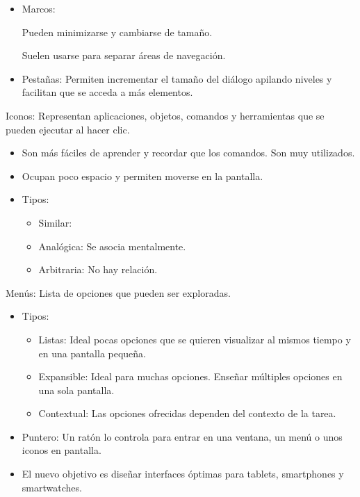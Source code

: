 \documentclass[12pt, twoside, openright]{report} %
\begin{document}
\begin{itemize}
\begin{itemize}
\begin{itemize}
			            \item Marcos:

			                  Pueden minimizarse y cambiarse de tamaño.

			                  Suelen usarse para separar áreas de navegación.


			            \item Pestañas:
			                  Permiten incrementar el tamaño del diálogo apilando
			                  niveles y facilitan que se acceda a más elementos.

		            \end{itemize}
	      \end{itemize}
\end{itemize}
\pagebreak
Iconos: Representan aplicaciones, objetos, comandos y
herramientas que se pueden ejecutar al hacer clic.

\begin{itemize}
	\item Son más fáciles de aprender y recordar que los comandos. Son
	      muy utilizados.
	\item Ocupan poco espacio y permiten moverse en la pantalla.
	\item Tipos:

	      \begin{itemize}
		      \item Similar:

		      \item Analógica: Se asocia mentalmente.

		      \item Arbitraria: No hay relación.
	      \end{itemize}
\end{itemize}

Menús: Lista de opciones que pueden ser exploradas.

\begin{itemize}
	\item Tipos:

	      \begin{itemize}
		      \item Listas: Ideal pocas opciones que se quieren visualizar al
		            mismos tiempo y en una pantalla pequeña.

		      \item Expansible: Ideal para muchas opciones. Enseñar múltiples
		            opciones en una sola pantalla.

		      \item Contextual: Las opciones ofrecidas dependen del contexto de
		            la tarea.
	      \end{itemize}

	\item Puntero: Un ratón lo controla para entrar en una ventana, un
	      menú o unos iconos en pantalla.
	\item El nuevo objetivo es diseñar interfaces óptimas para tablets,
	      smartphones y smartwatches.
\end{itemize}
\end{document}
